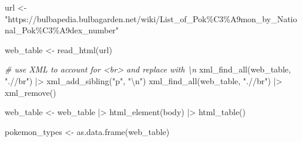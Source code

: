 \documentclass[
]{article}
\newenvironment{Shaded}{\begin{snugshade}}{\end{snugshade}}
\newcommand{\CommentTok}[1]{\textcolor[rgb]{0.56,0.35,0.01}{\textit{#1}}}
\newcommand{\FunctionTok}[1]{\textcolor[rgb]{0.00,0.00,0.00}{#1}}
\newcommand{\NormalTok}[1]{#1}
\newcommand{\OtherTok}[1]{\textcolor[rgb]{0.56,0.35,0.01}{#1}}
\newcommand{\SpecialCharTok}[1]{\textcolor[rgb]{0.00,0.00,0.00}{#1}}
\newcommand{\StringTok}[1]{\textcolor[rgb]{0.31,0.60,0.02}{#1}}
\begin{document}
\begin{Shaded}
\begin{Highlighting}[]
\NormalTok{url }\OtherTok{\textless{}{-}} \StringTok{"https://bulbapedia.bulbagarden.net/wiki/List\_of\_Pok\%C3\%A9mon\_by\_National\_Pok\%C3\%A9dex\_number"}

\NormalTok{web\_table }\OtherTok{\textless{}{-}} \FunctionTok{read\_html}\NormalTok{(url) }

\CommentTok{\# use XML to account for \textless{}br\textgreater{} and replace with \textquotesingle{}\textbackslash{}n\textquotesingle{}}
\FunctionTok{xml\_find\_all}\NormalTok{(web\_table, }\StringTok{".//br"}\NormalTok{) }\SpecialCharTok{|\textgreater{}} 
  \FunctionTok{xml\_add\_sibling}\NormalTok{(}\StringTok{"p"}\NormalTok{, }\StringTok{"}\SpecialCharTok{\textbackslash{}n}\StringTok{"}\NormalTok{)}
\FunctionTok{xml\_find\_all}\NormalTok{(web\_table, }\StringTok{".//br"}\NormalTok{) }\SpecialCharTok{|\textgreater{}} 
  \FunctionTok{xml\_remove}\NormalTok{() }

\NormalTok{web\_table }\OtherTok{\textless{}{-}} 
\NormalTok{  web\_table }\SpecialCharTok{|\textgreater{}} 
  \FunctionTok{html\_element}\NormalTok{(}\StringTok{\textquotesingle{}body\textquotesingle{}}\NormalTok{) }\SpecialCharTok{|\textgreater{}} 
  \FunctionTok{html\_table}\NormalTok{()}

\NormalTok{pokemon\_types }\OtherTok{\textless{}{-}} \FunctionTok{as.data.frame}\NormalTok{(web\_table)}
\end{Highlighting}
\end{Shaded}
\end{document}
